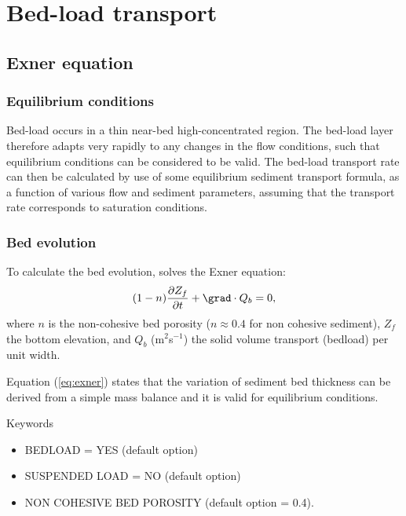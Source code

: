 \section{Bed-load transport}\label{ch:bedload}
\subsection{Exner equation}

\subsubsection{Equilibrium conditions}
Bed-load occurs in a thin near-bed high-concentrated region. The bed-load
layer therefore adapts very rapidly to any changes in the flow conditions,
such that equilibrium conditions can be considered to be valid. The bed-load
transport rate can then be calculated by use of some equilibrium sediment
transport formula, as a function of various flow and sediment parameters,
assuming that the transport rate corresponds to saturation conditions.

\subsubsection{Bed evolution}
To calculate the bed evolution, \sisyphe solves the Exner equation:
\begin{equation}\label{eq:exner}
(1-n)\frac{\partial Z_f}{\partial t} + \grad\cdot Q_b =0, 
\end{equation}
where $n$ is the non-cohesive bed porosity ($n \approx 0.4$ for non cohesive sediment), $Z_f$ the bottom elevation, and $Q_b$ (m$^{2}$s$^{-1}$) the solid volume transport (bedload) per unit width.
%
%

Equation (\ref{eq:exner}) states that the variation of sediment bed thickness can be
derived from a simple mass balance and it is valid for equilibrium
conditions. 

\medskip
\begin{bclogo}[couleur=blue!10,arrondi=0.1, logo=\bcinfo]{Keywords}
\begin{itemize}
\item {\ttfamily BEDLOAD = YES} (default option)
\item {\ttfamily SUSPENDED LOAD = NO} (default option)
\item {\ttfamily NON COHESIVE BED POROSITY} (default option {\ttfamily = 0.4}). 
\end{itemize}
\end{bclogo}

